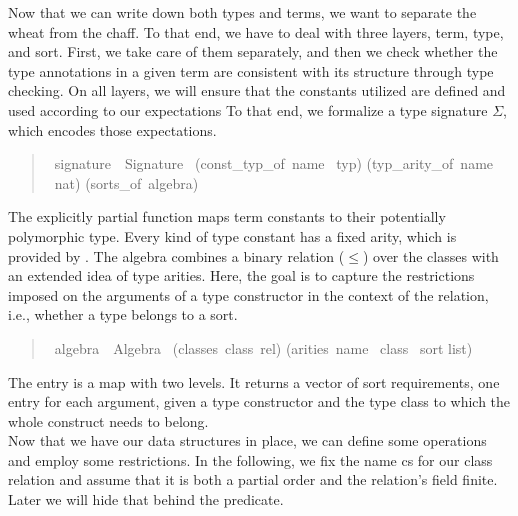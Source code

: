 Now that we can write down both types and terms, we want to separate the wheat from the chaff.
To that end, we have to deal with three layers, term, type, and sort.
First, we take care of them separately, and then we check whether the type annotations in a given term are consistent with its structure through type checking.
On all layers, we will ensure that the constants utilized are defined and used according to our expectations
To that end, we formalize a type signature \(\Sigma\), which encodes those expectations.

\begin{quote}
    \begin{isabelle}
        \ signature\ {\isacharequal}\ Signature\ \isanewline
        \isaindent{\ \ }(const\_typ\_of{\isacharcolon}\ name \isasymrightharpoonup\ typ)\isanewline
        \isaindent{\ \ }(typ\_arity\_of{\isacharcolon}\ name \isasymrightharpoonup\ nat)\isanewline
        \isaindent{\ \ }(sorts\_of{\isacharcolon}\ algebra)
    \end{isabelle}
\end{quote}

The explicitly partial  function  maps term constants to their potentially polymorphic type.
Every kind of type constant has a fixed arity, which is provided by .
The algebra combines a binary relation (\(\leq\)) over the classes with an extended idea of type arities.
Here, the goal is to capture the restrictions imposed on the arguments of a type constructor in the context of the  relation, i.e., whether a type belongs to a sort.

\begin{quote}
    \begin{isabelle}
        \ algebra\ {\isacharequal}\ Algebra\ \isanewline
        \isaindent{\ \ }(classes{\isacharcolon}\ class\ rel)\isanewline
        \isaindent{\ \ }(arities{\isacharcolon}\ name \isasymrightharpoonup\ class \isasymrightharpoonup\ sort list)
    \end{isabelle}
\end{quote}

The  entry is a map with two levels.
It returns a vector of sort requirements, one entry for each argument, given a type constructor and the type class to which the whole construct needs to belong.\\
Now that we have our data structures in place, we can define some operations and employ some restrictions.
In the following, we fix the name cs for our class relation and assume that it is both a partial order and the relation's field finite.
Later we will hide that behind the  predicate.

